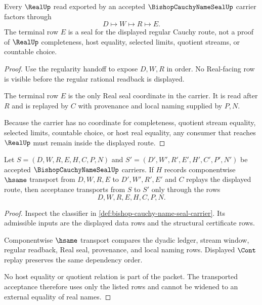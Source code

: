 \begin{theorem}
\label{thm:bishop-cauchy-name-seal-real-nonescape}
Every $\RealUp$ read exported by an accepted $\BishopCauchyNameSealUp$ carrier factors through
$$
D\longmapsto W\longmapsto R\longmapsto E .
$$
The terminal row $E$ is a seal for the displayed regular Cauchy route, not a proof of $\RealUp$ completeness, host equality, selected limits, quotient streams, or countable choice.
\end{theorem}
\begin{proof}
Use the regularity handoff to expose $D,W,R$ in order. No Real-facing row is visible before the regular rational readback is displayed.

The terminal row $E$ is the only Real seal coordinate in the carrier. It is read after $R$ and is replayed by $C$ with provenance and local naming supplied by $P,N$.

Because the carrier has no coordinate for completeness, quotient stream equality, selected limits, countable choice, or host real equality, any consumer that reaches $\RealUp$ must remain inside the displayed route.
\end{proof}

\begin{theorem}
\label{thm:bishop-cauchy-name-seal-classifier-transport}
Let $S=(D,W,R,E,H,C,P,N)$ and $S'=(D',W',R',E',H',C',P',N')$ be accepted $\BishopCauchyNameSealUp$ carriers. If $H$ records componentwise $\hsame$ transport from $D,W,R,E$ to $D',W',R',E'$ and $C$ replays the displayed route, then acceptance transports from $S$ to $S'$ only through the rows
$$
D,W,R,E,H,C,P,N .
$$
\end{theorem}
\begin{proof}
Inspect the classifier in \autoref{def:bishop-cauchy-name-seal-carrier}. Its admissible inputs are the displayed data rows and the structural certificate rows.

Componentwise $\hsame$ transport compares the dyadic ledger, stream window, regular readback, Real seal, provenance, and local naming rows. Displayed $\Cont$ replay preserves the same dependency order.

No host equality or quotient relation is part of the packet. The transported acceptance therefore uses only the listed rows and cannot be widened to an external equality of real names.
\end{proof}

